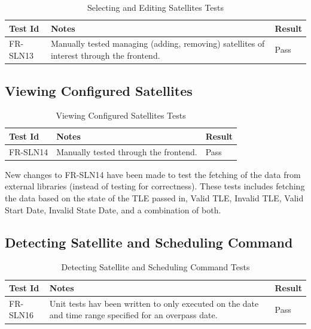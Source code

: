 \documentclass[12pt, titlepage]{article}
\begin{document}
\begin{center}
\begin{longtable}{|p{2cm} | p{8cm} |p{2cm}| }
\caption{Selecting and Editing Satellites Tests}
\hline
\textbf{Test Id} & \textbf{Notes} & \textbf{Result} \\
\hline
FR-SLN13 & Manually tested managing (adding, removing) satellites of interest through the frontend. & Pass \\
\hline

\end{longtable}
\end{center}

\subsection{Viewing Configured Satellites}

\begin{center}
\begin{longtable}{|p{2cm} | p{8cm} |p{2cm}| }
\caption{Viewing Configured Satellites Tests}
\hline
\textbf{Test Id} & \textbf{Notes} & \textbf{Result} \\
\hline
FR-SLN14 & Manually tested through the frontend. & Pass \\
\hline

\end{longtable}
\end{center}

New changes to FR-SLN14 have been made to test the fetching of the
data from external libraries (instead of testing for correctness). These
tests includes fetching the data based on the state of the TLE passed
in, Valid TLE, Invalid TLE, Valid Start Date, Invalid State Date, and
a combination of both.

\subsection{Detecting Satellite and Scheduling Command}

\begin{center}
\begin{longtable}{|p{2cm} | p{8cm} |p{2cm}| }
\caption{Detecting Satellite and Scheduling Command Tests}
\hline
\textbf{Test Id} & \textbf{Notes} & \textbf{Result} \\
\hline
FR-SLN16 & Unit tests hav been written to only executed on the date and time range specified for an overpass date. & Pass \\
\hline

\end{longtable}
\end{center}
\end{document}
